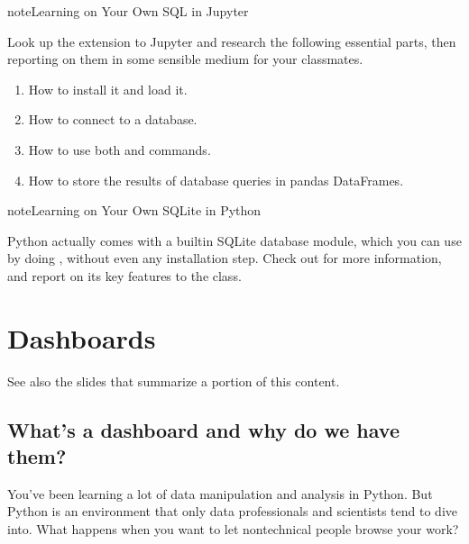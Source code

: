 \documentclass[letterpaper,10pt,english]{sphinxmanual}
\begin{document}
\begin{sphinxadmonition}{note}{Learning on Your Own \sphinxhyphen{} SQL in Jupyter}

Look up the  extension to Jupyter and research the following essential parts, then reporting on them in some sensible medium for your classmates.
\begin{enumerate}
%
\item {} 
How to install it and load it.

\item {} 
How to connect to a database.

\item {} 
How to use both  and  commands.

\item {} 
How to store the results of database queries in pandas DataFrames.

\end{enumerate}
\end{sphinxadmonition}

\begin{sphinxadmonition}{note}{Learning on Your Own \sphinxhyphen{} SQLite in Python}

Python actually comes with a built\sphinxhyphen{}in SQLite database module, which you can use by doing , without even any installation step.  Check out  for more information, and report on its key features to the class.
\end{sphinxadmonition}


\chapter{Dashboards}
\label{\detokenize{chapter-14-dashboards:dashboards}}\label{\detokenize{chapter-14-dashboards::doc}}
See also the slides that summarize a portion of this content.


\section{What’s a dashboard and why do we have them?}
\label{\detokenize{chapter-14-dashboards:what-s-a-dashboard-and-why-do-we-have-them}}
You’ve been learning a lot of data manipulation and analysis in Python.  But Python is an environment that only data professionals and scientists tend to dive into.  What happens when you want to let non\sphinxhyphen{}technical people browse your work?
\end{document}
